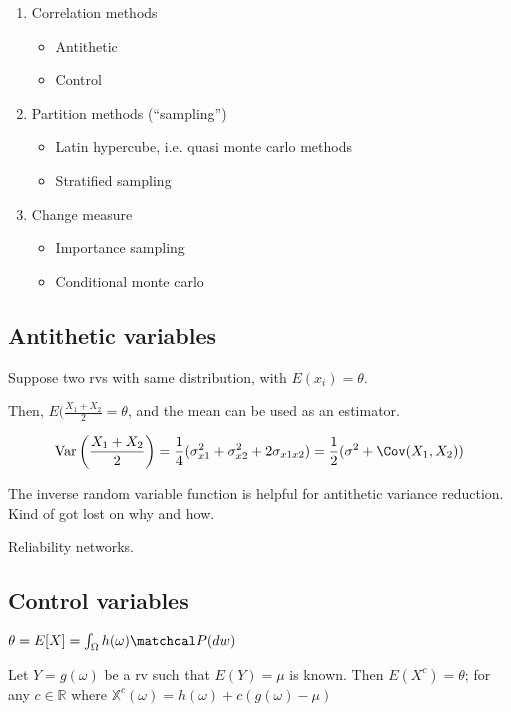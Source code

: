 \documentclass{article}
\DeclareMathOperator{\Var}{Var}
\begin{document}
\begin{enumerate}
    \item Correlation methods
        \begin{itemize}
            \item Antithetic
            \item Control
        \end{itemize}
    \item Partition methods (``sampling'')
        \begin{itemize}
            \item Latin hypercube, i.e. quasi monte carlo methods
            \item Stratified sampling
        \end{itemize}
    \item Change measure
        \begin{itemize}
            \item Importance sampling
            \item Conditional monte carlo
        \end{itemize}
\end{enumerate}

\subsection{Antithetic variables}

Suppose two rvs with same distribution, with $E(x_i) = \theta$.

Then, $E(\frac{X_1 + X_2}{2} = \theta$, and the mean can be used as an
estimator.

\[
    \Var\left(\frac{X_1+X_2}{2}\right) = \frac{1}{4}(\sigma_{x1}^2 +
    \sigma_{x2}^2 + 2 \sigma_{x1x2}) = \frac{1}{2}(\sigma^2 + \Cov(X_1,X_2))
\]

The inverse random variable function is helpful for antithetic variance
reduction. Kind of got lost on why and how.

Reliability networks.

\subsection{Control variables}

$\theta = E[X] = \int_\Omega h(\omega)\matchcal P(dw)$

Let $Y = g(\omega)$ be a rv such that $E(Y) = \mu$ is known. Then
$E(X^c) = \theta$; for any $c\in\mathbb R$ where $\mathbb X^c(\omega) =
h(\omega) + c( g(\omega) - \mu)$
\end{document}
